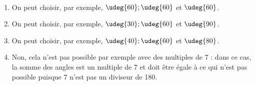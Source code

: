    \ \\ [-5mm]
   \begin{enumerate}
      \item On peut choisir, par exemple, {\blue $\udeg{60} ; \udeg{60}$ et $\udeg{60}$}.
      \item On peut choisir, par exemple, {\blue $\udeg{30} ; \udeg{60}$ et $\udeg{90}$}.
      \item On peut choisir, par exemple, {\blue $\udeg{40} ; \udeg{60}$ et $\udeg{80}$}.
      \item {\blue Non}, cela n'est pas possible par exemple avec des multiples de 7 : dans ce cas, la somme des angles est un multiple de 7 et doit être égale à  ce qui n'est pas possible puisque 7 n'est pas un diviseur de 180.
   \end{enumerate}
